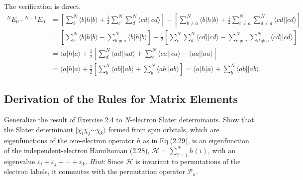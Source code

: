 \documentclass[a4paper]{book}
\newcounter{exercise}[chapter]
\newcounter{solution}[chapter]
\begin{document}
	\begin{solution}
	
	The verification is direct.
	\begin{align*}
		^N E_0 - ^{N-1} E_0 &= \left[ \sum^N_b \langle b | h | b \rangle + \frac{1}{2} \sum^N_c \sum^N_d \langle cd || cd \rangle \right] - \left[ \sum^N_{b \neq a}  \langle b | h | b \rangle + \frac{1}{2} \sum^N_{c \neq a} \sum^N_{d \neq a} \langle cd ||cd \rangle \right] \\
		&= \left[ \sum^N_b \langle b | h | b \rangle - \sum^N_{b \neq a} \langle b | h | b \rangle \right] + \frac{1}{2} \left[  \sum^N_c \sum^N_d \langle cd || cd \rangle - \sum^N_{c \neq a} \sum^N_{d \neq a} \langle cd ||cd \rangle \right] \\
		&= \langle a | h | a \rangle + \frac{1}{2} \left[ \sum^N_d \langle ad || ad \rangle + \sum^N_c \langle ca || ca \rangle - \langle aa || aa \rangle \right] \\
		&= \langle a | h | a \rangle + \frac{1}{2} \left[ \sum^N_b \langle ab || ab \rangle + \sum^N_b \langle ab || ab \rangle \right] = \langle a | h | a \rangle + \sum^N_b \langle ab ||ab \rangle.
	\end{align*}
	
	\end{solution}
	
	\subsection{Derivation of the Rules for Matrix Elements}
	
	\begin{exercise}
	Generalize the result of Exercise 2.4 to $N$-electron Slater determinants. Show that the Slater determinant $| \chi_i \chi_j \cdots \chi_k \rangle$ formed from spin orbitals, which are eigenfunctions of the one-electron operator $h$ as in Eq.(2.29), is an eigenfunction of the independent-electron Hamiltonian (2.28), $\mathscr{H} = \sum_{i=1}^N h(i)$, with an eigenvalue $\varepsilon_i + \varepsilon_j + \cdots + \varepsilon_k$. {\it Hint}: Since $\mathscr{H}$ is invariant to permutations of the electron labels, it commutes with the permutation operator $\mathscr{P}_n$.
	\end{exercise}
	
\end{document}
